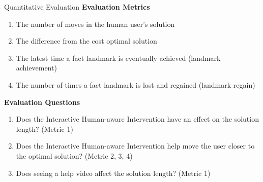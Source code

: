 \begin{frame}{Quantitative Evaluation}
\textbf{Evaluation Metrics}
\begin{enumerate}
\item The number of moves in the human user's solution
\item The difference from the cost optimal solution
\item The latest time a fact landmark is eventually achieved (landmark achievement)
\item The number of times a fact landmark is lost and regained (landmark regain)
\end{enumerate}

\textbf{Evaluation Questions}
\begin{enumerate}
\item Does the Interactive Human-aware Intervention have an effect on the solution length? (Metric 1)
\item Does the Interactive Human-aware Intervention help move the user closer to the optimal solution? (Metric 2, 3, 4)
\item Does seeing a help video affect the solution length? (Metric 1)
\end{enumerate}

\end{frame}